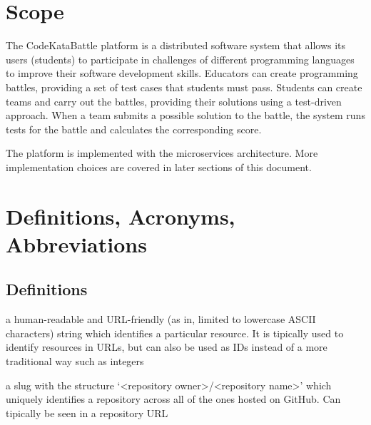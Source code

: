 \section{Scope}
The CodeKataBattle platform is a distributed software system that allows its users (students) to participate in challenges of different programming languages to improve their software development skills.
Educators can create programming battles, providing a set of test cases that students must pass.
Students can create teams and carry out the battles, providing their solutions using a test-driven approach.
When a team submits a possible solution to the battle, the system runs tests for the battle and calculates the corresponding score.

The platform is implemented with the microservices architecture. 
More implementation choices are covered in later sections of this document.

\section{Definitions, Acronyms, Abbreviations}

\subsection{Definitions}
\begin{description}[leftmargin=0pt]
    \item[Slug:] a human-readable and URL-friendly (as in, limited to lowercase ASCII characters) string which
          identifies a particular resource. It is tipically used to identify resources in URLs, but can also be used
          as IDs instead of a more traditional way such as integers
    \item[GitHub Repository Slug:] a slug with the structure `<repository owner>/<repository name>' which uniquely
          identifies a repository across all of the ones hosted on GitHub. Can tipically be seen in a repository URL
\end{description}

